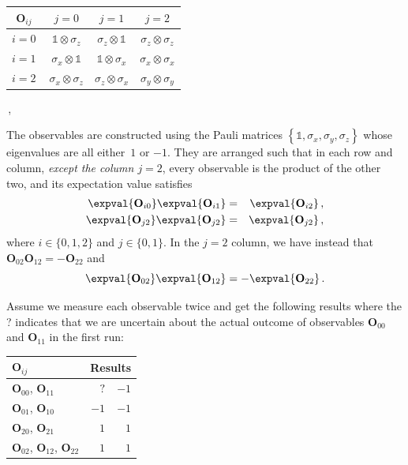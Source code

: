 \documentclass[english,reprint, aps, prl,superscriptaddress, showpacs,
showkeys, longbibliography, amsmath, amssymb, floatfix]{revtex4-1}
\theoremstyle{plain}
\theoremstyle{definition}
\begin{document}
{\renewcommand{\arraystretch}{2}%
\begin{center} 
\begin{tabular}{r|@{\quad}c@{\quad}|@{\quad}c@{\quad}|@{\quad}c@{\quad}|} 
$\mathbf{O}_{ij}$~ & $j=0$ & $j=1$ & $j=2$ \\ 
\hline  
$i=0~$ & $\mathbb{1}\otimes\sigma_{z}$  & $\sigma_{z}\otimes\mathbb{1}$  & $\sigma_{z}\otimes\sigma_{z}$ \tabularnewline 
\hline  
$i=1~$ & $\sigma_{x}\otimes\mathbb{1}$  & $\mathbb{1}\otimes\sigma_{x}$  & $\sigma_{x}\otimes\sigma_{x}$ \tabularnewline 
\hline  
$i=2~$ & $\sigma_{x}\otimes\sigma_{z}$  & $\sigma_{z}\otimes\sigma_{x}$  & $\sigma_{y}\otimes\sigma_{y}$ \tabularnewline 
\hline  
\end{tabular}\,,
\par\end{center} 
}

\noindent The observables are constructed using the Pauli matrices
$\left\{ \mathbb{1},\sigma_{x},\sigma_{y},\sigma_{z}\right\} $ whose
eigenvalues are all either~$1$ or $-1$. They are arranged such
that in each row and column, \emph{except the column $j=2$}, every
observable is the product of the other two, and its expectation value
satisfies 
\begin{eqnarray}
\expval{\mathbf{O}_{i0}}\expval{\mathbf{O}_{i1}} & = & \expval{\mathbf{O}_{i2}}\,,\label{eq:i_expectation_value}\\
\expval{\mathbf{O}_{j2}}\expval{\mathbf{O}_{j2}} & = & \expval{\mathbf{O}_{j2}}\,,\label{eq:j_0_1_expectation_value}
\end{eqnarray}
where $i\in\{0,1,2\}$ and $j\in\{0,1\}$. In the $j=2$ column, we
have instead that $\mathbf{O}_{02}\mathbf{O}_{12}=-\mathbf{O}_{22}$
and 
\begin{equation}
\expval{\mathbf{O}_{02}}\expval{\mathbf{O}_{12}}=-\expval{\mathbf{O}_{22}}\,.\label{eq:j_2_expectation_value}
\end{equation}

Assume we measure each observable twice and get the following results
where the ? indicates that we are uncertain about the actual outcome
of observables $\mathbf{O}_{00}$ and $\mathbf{O}_{11}$ in the first run:
\begin{center}
\begin{tabular}{l@{\qquad}r@{\qquad}r}
\toprule 
\addlinespace
$\mathbf{O}_{ij}$  & \multicolumn{2}{c}{Results} \\
\midrule
\midrule 
\addlinespace
$\mathbf{O}_{00}$, $\mathbf{O}_{11}$ & $?$  & $-1$  \\
\midrule 
\addlinespace
$\mathbf{O}_{01}$, $\mathbf{O}_{10}$ & $-1$  & $-1$  \\
\midrule 
\addlinespace
$\mathbf{O}_{20}$, $\mathbf{O}_{21}$ & $1$  & $1$  \\
\midrule 
\addlinespace
$\mathbf{O}_{02}$, $\mathbf{O}_{12}$, $\mathbf{O}_{22}$ & $1$  & $1$  \\
\bottomrule
\end{tabular}
\par\end{center}
\end{document}
